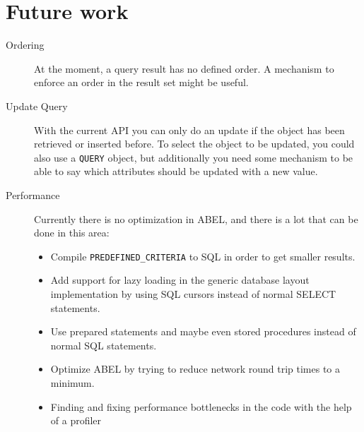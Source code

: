 \section{Future work}
\begin{description}
 \item [Ordering] At the moment, a query result has no defined order. A mechanism to enforce an order in the result set might be useful.
 \item [Update Query] With the current API you can only do an update if the object has been retrieved or inserted before. 
To select the object to be updated, you could also use a \lstinline!QUERY! object, but additionally you need some mechanism to be able to say which attributes should be updated with a new value.
 \item [Performance] Currently there is no optimization in ABEL, and there is a lot that can be done in this area:
 \begin{itemize}
  \item Compile \lstinline!PREDEFINED_CRITERIA! to SQL in order to get smaller results.
 \item Add support for lazy loading in the generic database layout implementation by using SQL cursors instead of normal SELECT statements.
 \item Use prepared statements and maybe even stored procedures instead of normal SQL statements.
 \item Optimize ABEL by trying to reduce network round trip times to a minimum.
 \item Finding and fixing performance bottlenecks in the code with the help of a profiler
\end{itemize}


\end{description}
